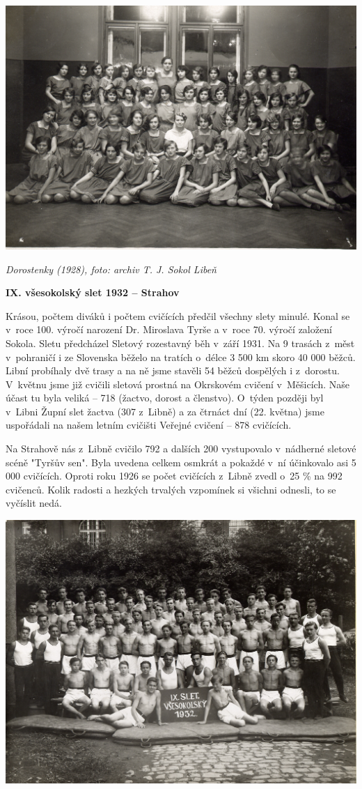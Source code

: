\documentclass[a5paper, 11pt, twoside]{article}
\begin{document}
 \includegraphics[width=\textwidth]{img/28_dorostenky.jpg}

\textit{Dorostenky (1928), foto: archiv T. J. Sokol Libeň}

\textbf{IX. všesokolský slet 1932 -- Strahov}

Krásou, počtem diváků i počtem cvičících předčil všechny slety minulé.
Konal se v~roce 100. výročí narození Dr. Miroslava Tyrše a v~roce 70.
výročí založení Sokola. Sletu předcházel Sletový rozestavný běh v~září
1931. Na 9 trasách z~měst v~pohraničí i ze Slovenska běželo na tratích
o~délce 3 500 km skoro 40 000 běžců. Libní probíhaly dvě trasy a na ně
jsme stavěli 54 běžců dospělých i z~dorostu. V~květnu jsme již cvičili
sletová prostná na Okrskovém cvičení v~Měšicích. Naše účast tu byla
veliká -- 718 (žactvo, dorost a členstvo). O~týden později byl v~Libni
Župní slet žactva (307 z~Libně) a za čtrnáct dní (22. května) jsme
uspořádali na našem letním cvičišti Veřejné cvičení -- 878 cvičících.

Na Strahově nás z~Libně cvičilo 792 a dalších 200 vystupovalo v~nádherné
sletové scéně "Tyršův sen". Byla uvedena celkem osmkrát a pokaždé v~ní
účinkovalo asi 5 000 cvičících. Oproti roku 1926 se počet cvičících
z~Libně zvedl o~25 \% na 992 cvičenců. Kolik radosti a hezkých trvalých
vzpomínek si všichni odnesli, to se vyčíslit nedá.

 \includegraphics[width=\textwidth]{img/29_muzi_slet.jpg}
\end{document}
